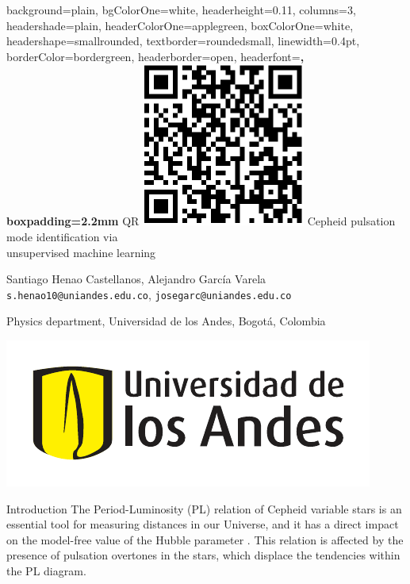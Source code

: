 \documentclass[
    a0paper,
    portrait,
]{baposter}
\begin{document}
\begin{poster}{
  background=plain,
  bgColorOne=white,
  headerheight=0.11\textheight,
  columns=3,
  headershade=plain,
  headerColorOne=applegreen,
  boxColorOne=white,
  headershape=smallrounded,
  textborder=roundedsmall,
  linewidth=0.4pt,
  borderColor=bordergreen,
  headerborder=open,
  headerfont=\large\bf,
  boxpadding=2.2mm
}{QR
    \includegraphics[width=0.60\headerheight]{fig/QR.pdf}
}{ \huge
    Cepheid pulsation mode identification via \\ unsupervised machine learning
}{
    \normalsize \vspace{2mm}
    Santiago Henao Castellanos,
    Alejandro García Varela \\ \vspace{1mm}
    \texttt{s.henao10@uniandes.edu.co}, 
    \texttt{josegarc@uniandes.edu.co}
    
    Physics department, Universidad de los Andes, Bogotá, Colombia \\ 
    
}{
    \includegraphics[width=1.5\headerheight]{fig/logo-uniandes.pdf}
}

\begin{posterbox}[name=intro,column=0]{Introduction}
    The Period-Luminosity (PL) relation of Ceph\-eid variable stars is an essential tool for measuring distances in our Universe, and it has a direct impact on the model-free value of the Hubble parameter \citep{Riess2023}. This relation is affected by the presence of pulsation overtones in the stars, which displace the tendencies within the PL diagram.


\end{posterbox}
\end{poster}
\end{document}
